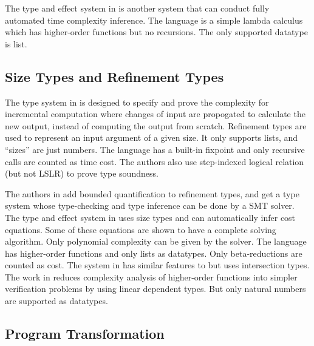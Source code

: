\documentclass[preprint]{sigplanconf}
\begin{document}
The type and effect system in \cite{portillo} is another system that can conduct fully automated time complexity inference. The language is a simple lambda calculus which has higher-order functions but no recursions. The only supported datatype is list.

\subsection{Size Types and Refinement Types}

The type system in \cite{cicek} is designed to specify and prove the complexity for incremental computation where changes of input are propogated to calculate the new output, instead of computing the output from scratch. Refinement types are used to represent an input argument of a given size. It only supports lists, and ``sizes'' are just numbers. The language has a built-in fixpoint and only recursive calls are counted as time cost. The authors also use step-indexed logical relation (but not LSLR) to prove type soundness.

The authors in \cite{vazou2015} add bounded quantification to refinement types, and get a type system whose type-checking and type inference can be done by a SMT solver. The type and effect system in \cite{vasconcelos} uses size types and can automatically infer cost equations. Some of these equations are shown to have a complete solving algorithm. Only polynomial complexity can be given by the solver. The language has higher-order functions and only lists as datatypes. Only beta-reductions are counted as cost. The system in \cite{simoes} has similar features to \cite{vasconcelos} but uses intersection types. The work in \cite{lago} reduces complexity analysis of higher-order functions into simpler verification problems by using linear dependent types. But only natural numbers are supported as datatypes.

\subsection{Program Transformation}
\end{document}
